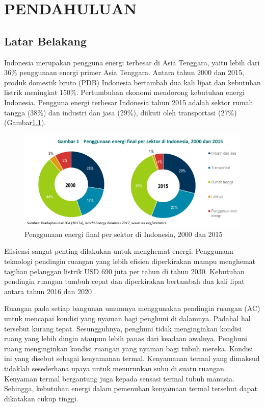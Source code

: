 \chapter{PENDAHULUAN}\label{pendahuluan}
\section{Latar Belakang}\label{latar belakang}

Indonesia merupakan pengguna energi terbesar di Asia Tenggara, yaitu lebih dari 36\% penggunaan energi primer Asia Tenggara. Antara tahun 2000 dan 2015, produk domestik bruto (PDB) Indonesia bertambah dua kali lipat dan kebutuhan listrik meningkat 150\%. Pertumbuhan ekonomi mendorong kebutuhan energi Indonesia. Pengguna energi terbesar Indonesia tahun
2015 adalah sektor rumah tangga (38\%) dan industri dan jasa (29\%), diikuti oleh transportasi (27\%) (Gambar\ref{fig:1:energy}).
\begin{figure}[!h]
	\centering
	\includegraphics[width=1\textwidth]{figures/EnergyUsage}
	\caption{Penggunaan energi final per sektor di Indonesia, 2000 dan 2015}
	\label{fig:1:energy}
\end{figure}
Efisiensi sangat penting dilakukan untuk menghemat energi. Penggunaan teknologi pendingin ruangan yang lebih efisien diperkirakan mampu
menghemat tagihan pelanggan listrik USD 690 juta per tahun di tahun 2030. Kebutuhan
pendingin ruangan tumbuh cepat dan diperkirakan bertambah dua kali lipat antara tahun
2016 dan 2020 \cite{IEA}.

Ruangan pada setiap bangunan umumnya menggunakan pendingin ruangan (AC) untuk mencapai kondisi yang nyaman bagi penghuni di dalamnya. Padahal hal tersebut kurang tepat. Sesungguhnya, penghuni tidak menginginkan kondisi ruang yang lebih dingin ataupun lebih panas dari keadaan awalnya. Penghuni ruang menginginkan kondisi ruangan yang nyaman bagi tubuh mereka. Kondisi ini yang disebut sebagai kenyamanan termal. Kenyamanan termal yang dimaksud tidaklah sesederhana upaya untuk menurunkan suhu di suatu ruangan. Kenyaman termal bergantung juga kepada sensasi termal tubuh manusia. Sehingga, kebutuhan energi dalam pemenuhan kenyamaan termal tersebut dapat dikatakan cukup tinggi.

